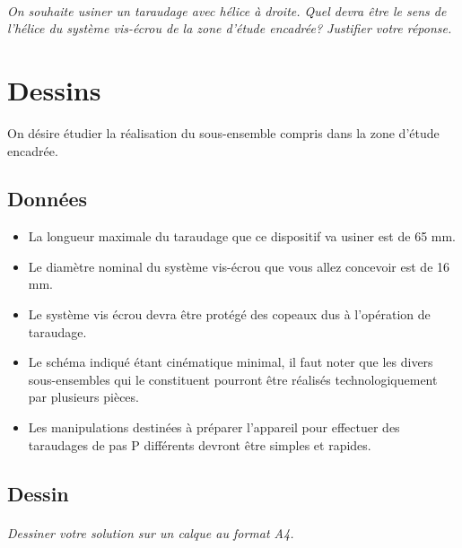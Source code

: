 \documentclass[11pt,oneside]{article}
\begin{document}
\paragraph{}
\textit{On souhaite usiner un taraudage avec hélice à droite. Quel devra être le sens de l'hélice du système vis-écrou de la zone d'étude encadrée? Justifier votre réponse.}

\section*{Dessins}

On désire étudier la réalisation du sous-ensemble compris dans la zone d'étude encadrée.
 
\subsection*{Données}
\begin{itemize}
\item La longueur maximale du taraudage que ce dispositif va usiner est de 65 mm.
\item Le diamètre nominal du système vis-écrou que vous allez concevoir est de 16 mm.
\item Le système vis écrou devra être protégé des copeaux dus à l'opération de taraudage.
\item Le schéma indiqué étant cinématique minimal, il faut noter que les divers sous-ensembles qui le constituent pourront être réalisés technologiquement par plusieurs pièces.
\item Les manipulations destinées à préparer l'appareil pour effectuer des taraudages de pas P différents devront être simples et rapides.
\end{itemize}

\subsection*{Dessin}
\paragraph{}
\textit{Dessiner votre solution sur un calque au format A4.}

\begin{center}
\end{center}
\end{document}
